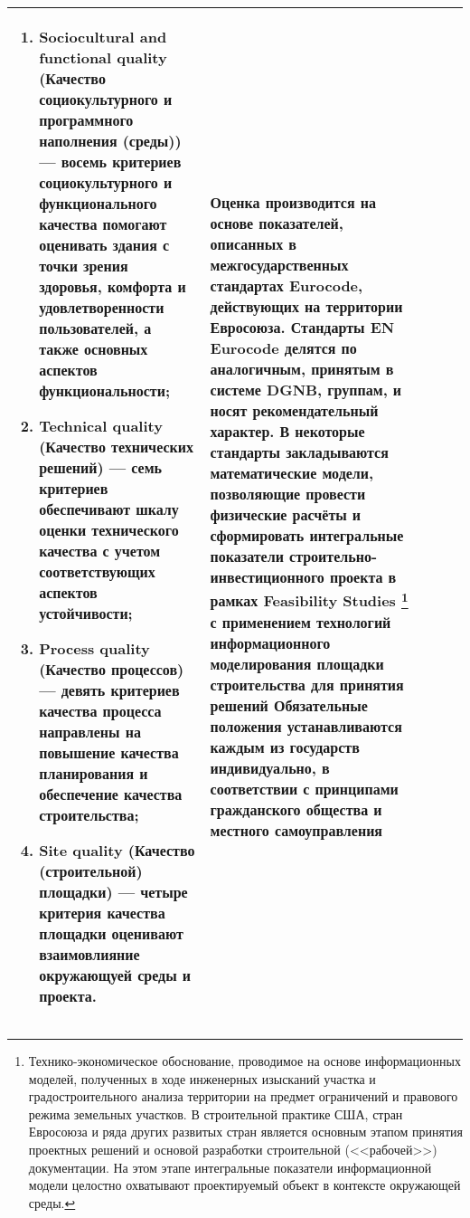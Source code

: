 \begin{landscape}
\begin{center}
\begin{longtable}{|m{40mm}|p{40mm}|p{40mm}|p{55mm}|p{55mm}|}
\begin{enumerate}[1)]
                        \item Sociocultural and functional quality (Качество социокультурного и программного наполнения (среды)) --- восемь критериев социокультурного и функционального качества помогают оценивать здания с точки зрения здоровья, комфорта и удовлетворенности пользователей, а также основных аспектов функциональности;
                        \item Technical quality (Качество технических решений) --- семь критериев обеспечивают шкалу оценки технического качества с учетом соответствующих аспектов устойчивости;
                        \item Process quality (Качество процессов) --- девять критериев качества процесса направлены на повышение качества планирования и обеспечение качества строительства;
                        \item Site quality (Качество (строительной) площадки) --- четыре критерия качества площадки оценивают взаимовлияние окружающуей среды и проекта.
                    \end{enumerate} &
                    Оценка производится на основе показателей, описанных в межгосударственных стандартах Eurocode, действующих на территории Евросоюза.
                    Стандарты EN Eurocode делятся по аналогичным, принятым в системе DGNB, группам, и носят рекомендательный характер.
                    В некоторые стандарты закладываются математические модели, позволяющие провести физические расчёты и сформировать интегральные показатели строительно-инвестиционного проекта
                    в рамках Feasibility Studies \footnote{Технико-экономическое обоснование, проводимое на основе информационных моделей, полученных в ходе инженерных изысканий участка и градостроительного анализа территории на предмет ограничений и правового режима земельных участков.
                            В строительной практике США, стран Евросоюза и ряда других развитых стран является основным этапом принятия проектных решений и основой разработки строительной (<<рабочей>>) документации.
                            На этом этапе интегральные показатели информационной модели целостно охватывают проектируемый объект в контексте окружающей среды.}
                    с применением технологий информационного моделирования площадки строительства для принятия решений
                    Обязательные положения устанавливаются каждым из государств индивидуально, в соответствии с принципами гражданского общества и местного самоуправления \\ \hline

            \end{longtable}
        \end{center}
    
\end{landscape}